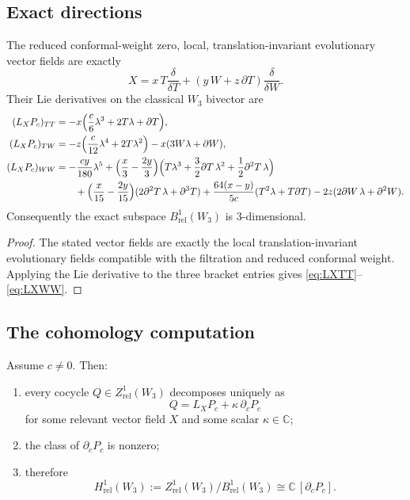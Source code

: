 \subsection{Exact directions}

\begin{proposition}\label{prop:W3exacts}
The reduced conformal-weight zero, local, translation-invariant evolutionary vector fields
are exactly
\[
X=x\,T\frac{\delta}{\delta T}+(y\,W+z\,\partial T)\frac{\delta}{\delta W}.
\]
Their Lie derivatives on the classical $W_3$ bivector are
\begin{align}
(L_XP_c)_{TT}
&=
-x\Big(\frac c6\lambda^3+2T\lambda+\partial T\Big),\label{eq:LXTT}\\
(L_XP_c)_{TW}
&=
-z\Big(\frac c{12}\lambda^4+2T\lambda^2\Big)-x(3W\lambda+\partial W),\label{eq:LXTW}\\
(L_XP_c)_{WW}
&=
-\frac{cy}{180}\lambda^5
+\Big(\frac x3-\frac{2y}{3}\Big)
\Big(T\lambda^3+\frac32\partial T\,\lambda^2+\frac12\partial^2T\,\lambda\Big)\notag\\
&\qquad
+\Big(\frac x{15}-\frac{2y}{15}\Big)(2\partial^2T\,\lambda+\partial^3T)
+\frac{64(x-y)}{5c}(T^2\lambda+T\partial T)
-2z(2\partial W\,\lambda+\partial^2W).\label{eq:LXWW}
\end{align}
Consequently the exact subspace $B^1_{\mathrm{rel}}(W_3)$ is $3$-dimensional.
\end{proposition}

\begin{proof}
The stated vector fields are exactly the local translation-invariant evolutionary fields
compatible with the filtration and reduced conformal weight. Applying the Lie derivative
to the three bracket entries gives \eqref{eq:LXTT}--\eqref{eq:LXWW}.
\end{proof}

\subsection{The cohomology computation}

\begin{theorem}\label{thm:H1W3}
Assume $c\neq 0$. Then:
\begin{enumerate}[leftmargin=2.4em]
\item every cocycle $Q\in Z^1_{\mathrm{rel}}(W_3)$ decomposes uniquely as
\[
Q=L_XP_c+\kappa\,\partial_c P_c
\]
for some relevant vector field $X$ and some scalar $\kappa\in \mathbb C$;
\item the class of $\partial_c P_c$ is nonzero;
\item therefore
\[
H^1_{\mathrm{rel}}(W_3):=
Z^1_{\mathrm{rel}}(W_3)/B^1_{\mathrm{rel}}(W_3)
\cong \mathbb C\,[\partial_cP_c].
\]
\end{enumerate}
\end{theorem}

